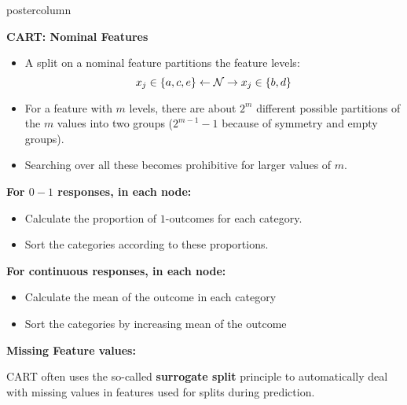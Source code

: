 \documentclass{beamer}
\newlength{\columnheight} %
\begin{document}
\begin{frame}[fragile]{}
\begin{columns}
\begin{column}{.31\textwidth}
\begin{beamercolorbox}[center]{postercolumn}
\begin{minipage}{.98\textwidth}
\parbox[t][\columnheight]{\textwidth}{
  \begin{myblock}{ }
  
  \begin{codebox}
  \textbf{CART: Nominal Features}	
  \end{codebox}
  
  \begin{itemize}[$\bullet$]     
  \setlength{\itemindent}{+.3in}
  \item A split on a nominal feature partitions the feature levels:
    $$x_j \in \{a,c,e\} \leftarrow \mathcal{N} \rightarrow x_j \in \{b,d\} $$
    \item For a feature with $m$ levels,
  there are about $2^m$ different possible partitions of the $m$ values into two groups\vspace*{1ex} ($2^{m-1} - 1$ because of symmetry and empty groups).
  \item Searching over all these becomes prohibitive for larger values of $m$.
  \end{itemize}

  \begin{codebox}
  \textbf{For $0-1$ responses, in each node: }
  \end{codebox}
  
  \begin{itemize}[$\bullet$]     
  \setlength{\itemindent}{+.3in}
  \item Calculate the proportion of $1$-outcomes for each category.
  \item Sort the categories according to these proportions.
  \end{itemize}

  \begin{codebox}
  \textbf{For continuous responses, in each node: }
  \end{codebox}
  
  \begin{itemize}[$\bullet$]     
  \setlength{\itemindent}{+.3in}
  \item Calculate the mean of the outcome in each category
  \item Sort the categories by increasing mean of the outcome
  \end{itemize}

  \begin{codebox}	
  \textbf{Missing Feature values: }	\end{codebox}
  CART often uses the so-called \textbf{surrogate split} principle to automatically deal with missing values in features used for splits during prediction.
  \vspace*{1ex}
  \end{myblock}
  
}
\end{minipage}
\end{beamercolorbox}
\end{column}
\end{columns}
\end{frame}
\end{document}
